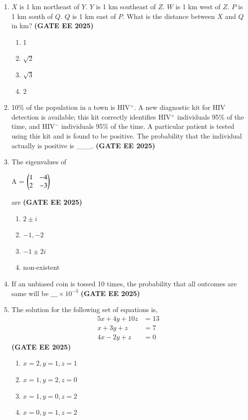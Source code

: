 \documentclass[journal,12pt,onecolumn]{IEEEtran}
\theoremstyle{remark}
\begin{document}
\begin{enumerate}
    \item $X$ is 1 km northeast of $Y$. $Y$ is 1 km southeast of $Z$. $W$ is 1 km west of $Z$. $P$ is 1 km south of $Q$. $Q$ is 1 km east of $P$. What is the distance between $X$ and $Q$ in km?  \hfill \textbf{(GATE EE 2025)}

    \begin{enumerate} 
        \item 1
        \item $\sqrt{2}$
        \item $\sqrt{3}$
        \item 2
    \end{enumerate}

    \item 10\% of the population in a town is HIV$^+$. A new diagnostic kit for HIV detection is available; this kit correctly identifies HIV$^+$ individuals 95\% of the time, and HIV$^-$ individuals 95\% of the time. A particular patient is tested using this kit and is found to be positive. The probability that the individual actually is positive is \_\_\_.  \hfill \textbf{(GATE EE 2025)}
    \item The eigenvalues of 

A = $\myvec {1 & -4 \\ 2 & -3 }$

are \hfill \textbf{(GATE EE 2025)}
\begin{enumerate}
\item  $2 \pm i$
\item  $-1, -2$
\item  $-1 \pm 2i$
\item  non-existent
\end{enumerate}

\item If an unbiased coin is tossed 10 times, the probability that all outcomes are same will be $\_\_\_ \times 10^{-3}$
\hfill \textbf{(GATE EE 2025)}
\item The solution for the following set of equations is,
\[
\begin{aligned}
5x + 4y + 10z &= 13 \\
x + 3y + z &= 7 \\
4x - 2y + z &= 0
\end{aligned}
\] \hfill \textbf{(GATE EE 2025)}
\begin{enumerate}
\item  $x=2, y=1, z=1$
\item  $x=1, y=2, z=0$
\item  $x=1, y=0, z=2$
\item  $x=0, y=1, z=2$
\end{enumerate}


\end{enumerate}
\end{document}
